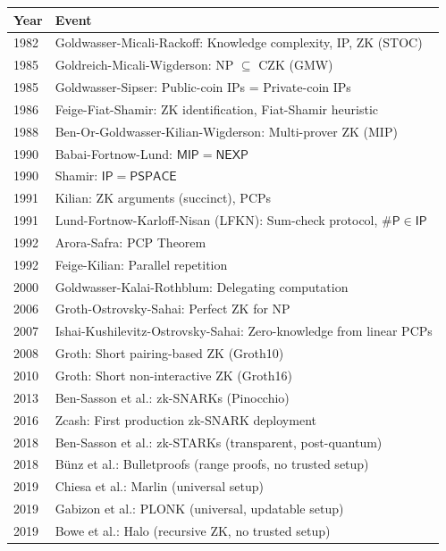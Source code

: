 \begin{tabularx}{\linewidth}{|l|X|}
\hline
\textbf{Year} & \textbf{Event} \\ \hline
1982 & Goldwasser-Micali-Rackoff: Knowledge complexity, IP, ZK (STOC) \\\hline
1985 & Goldreich-Micali-Wigderson: NP $\subseteq$ CZK (GMW) \\
\hline
1985 & Goldwasser-Sipser: Public-coin IPs = Private-coin IPs \\
\hline
1986 & Feige-Fiat-Shamir: ZK identification, Fiat-Shamir heuristic \\
\hline
1988 & Ben-Or-Goldwasser-Kilian-Wigderson: Multi-prover ZK (MIP) \\
\hline
1990 & Babai-Fortnow-Lund: $\mathsf{MIP} = \mathsf{NEXP}$ \\
\hline
1990 & Shamir: $\mathsf{IP} = \mathsf{PSPACE}$ \\
\hline
1991 & Kilian: ZK arguments (succinct), PCPs \\
\hline
1991 & Lund-Fortnow-Karloff-Nisan (LFKN): Sum-check protocol, $\#\mathsf{P} \in \mathsf{IP}$ \\
\hline
1992 & Arora-Safra: PCP Theorem \\
\hline
1992 & Feige-Kilian: Parallel repetition \\
\hline
2000 & Goldwasser-Kalai-Rothblum: Delegating computation \\
\hline
2006 & Groth-Ostrovsky-Sahai: Perfect ZK for NP \\
\hline
2007 & Ishai-Kushilevitz-Ostrovsky-Sahai: Zero-knowledge from linear PCPs \\
\hline
2008 & Groth: Short pairing-based ZK (Groth10) \\
\hline
2010 & Groth: Short non-interactive ZK (Groth16) \\
\hline
2013 & Ben-Sasson et al.: zk-SNARKs (Pinocchio) \\
\hline
2016 & Zcash: First production zk-SNARK deployment \\
\hline
2018 & Ben-Sasson et al.: zk-STARKs (transparent, post-quantum) \\
\hline
2018 & B\"unz et al.: Bulletproofs (range proofs, no trusted setup) \\
\hline
2019 & Chiesa et al.: Marlin (universal setup) \\
\hline
2019 & Gabizon et al.: PLONK (universal, updatable setup) \\
\hline
2019 & Bowe et al.: Halo (recursive ZK, no trusted setup) \\

\end{tabularx}
